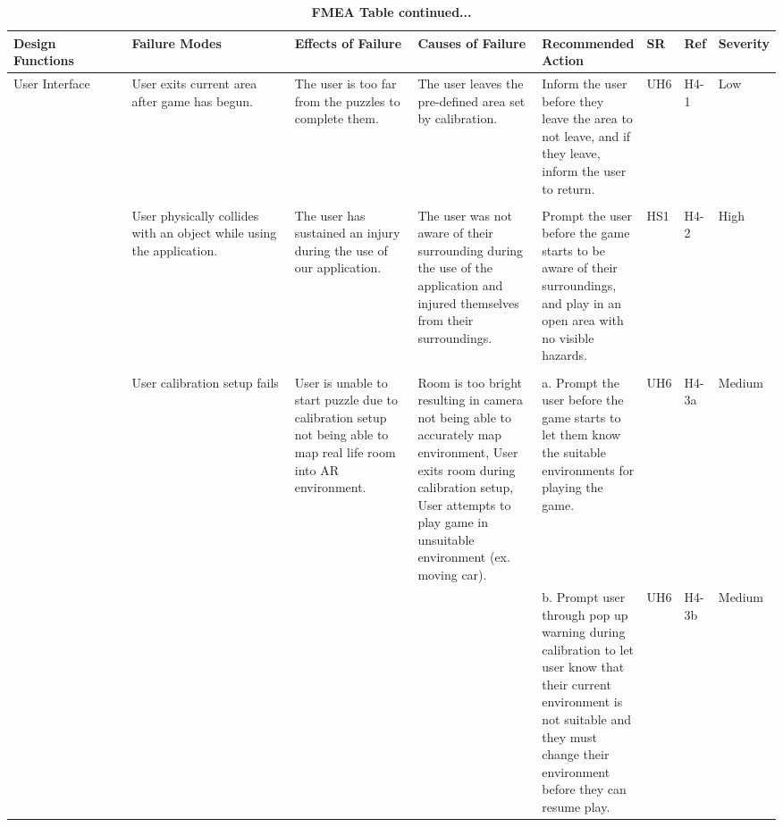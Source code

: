 \documentclass{article}
\begin{document}
\begin{table}[H]
    \begin{adjustbox}{width=(/5)}
    \centering
    

    \begin{tabular}{|p{0.20\linewidth} | p{0.30\linewidth} | p{0.20\linewidth}|  p{0.20\linewidth}|  p{0.30\linewidth}|  p{0.07\linewidth}|  p{0.09\linewidth}|p{0.12\linewidth}| }
    \hline
         \textbf{Design Functions} & \textbf{Failure Modes} & \textbf{Effects of Failure} & \textbf{Causes of Failure} & \textbf{Recommended Action} & \textbf{SR} & \textbf{Ref} & \textbf{Severity}\\
         \hline
          User Interface                   &           User exits current area after game has begun.            &           The user is too far from the puzzles to complete them.           &                The user leaves the pre-defined area set by calibration.            &           Inform the user before they leave the area to not leave, and if they leave, inform the user to return.                  &   UH6          &   H4-1           &   Low               \\&&&&&&&  \\
            &    User physically collides with an object while using the application.    &    The user has sustained an injury during the use of our application.      &  The user was not aware of their surrounding during the use of the application and injured themselves from their surroundings. \newline                 &    Prompt the user before the game starts to be aware of their surroundings, and play in an open area with no visible hazards.    &  HS1           &   H4-2     & High\\&&&&&&&               \\
                                   &    User calibration setup fails   &   User is unable to start puzzle due to calibration setup not being able to map real life room into AR environment. & Room is too bright resulting in camera not being able to accurately map environment, User exits room during calibration setup, User attempts to play game in unsuitable environment (ex. moving car). & a. Prompt the user before the game starts to let them know the suitable environments for playing the game. &UH6&H4-3a& Medium\\&&&& b. Prompt user through pop up warning during calibration to let user know that their current environment is not suitable and they must change their environment before they can resume play.   & UH6   & H4-3b & Medium   \\
          \hline
    \end{tabular}
    \end{adjustbox}
    \caption{\bf FMEA Table continued...}
    \label{tab:FMEA2}
\end{table}
\end{document}
